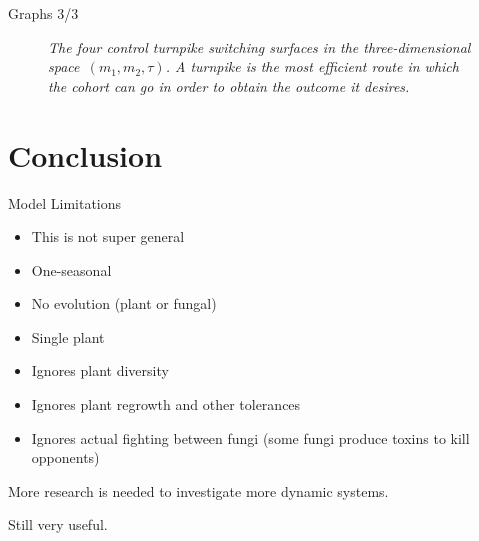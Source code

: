 \documentclass{beamer}
\begin{document}
\begin{frame}{Graphs 3/3}
    \begin{figure}
        \bf \caption{\it The four control turnpike switching surfaces in the three-dimensional space~$ (m_1, m_2, \tau) $. A turnpike is the most efficient route in which the cohort can go in order to obtain the outcome it desires.}
        \label{Fig_7}
    \end{figure}
\end{frame}

\section{Conclusion}
\begin{frame}{Model Limitations}
    \begin{itemize}
        \item This is not super general
        \item One-seasonal
        \item No evolution (plant or fungal)
        \item Single plant
        \item Ignores plant diversity 
        \item Ignores plant regrowth and other tolerances
        \item Ignores actual fighting between fungi (some fungi produce toxins to kill opponents)
    \end{itemize}
    
    More research is needed to investigate more dynamic systems.\newline
    
    Still very useful.
\end{frame}
\end{document}
